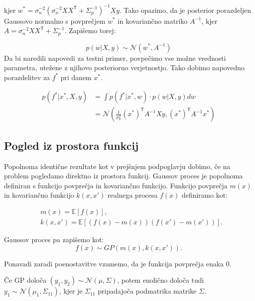 \documentclass[12pt,a4paper]{amsart}
\theoremstyle{definition} %
\theoremstyle{plain} %
\begin{document}
kjer $w^* =  \sigma_{n}^{-2} (  \sigma_{n}^{-2} X X^\mathsf{T} + \Sigma_{p}^{-1})^{-1}Xy$. Tako opazimo, da je posterior porazdeljen Gaussovo normalno s povprečjem
$w^*$ in kovariančno matriko $A^{-1}$, kjer $ A =  \sigma_{n}^{-2} X X^\mathsf{T} + \Sigma_{p}^{-1} $. Zapišemo torej:


\begin{equation}
 p(w |X,y) \sim \mathcal{N}(w^*, A^{-1}) 
\end{equation}
Da bi naredili napovedi za testni primer, povpečimo vse možne vrednosti parametra, utežene z njihovo posteriorno verjetnostjo.
Tako dobimo napovedno porazdelitev za $ f^{*}$ pri danem $x^{*}$.

\begin{equation}
\begin{split}
 p( f^* | x^*, X,y) &= \int p(f^* | x^*, w) \cdot p(w| X, y) dw  \\
 &= \mathcal{N}(\frac{1}{ \sigma_{n}^2} (x^*)^\mathsf{T} A^{-1} X y, (x^*)^\mathsf{T} A^{-1} x^*) 
 \end{split}
\end{equation}

\subsection{Pogled iz prostora funkcij}

Popolnoma identične rezultate kot v prejšnjem podpoglavju dobimo, če na problem pogledamo direktno iz prostora funkcij. 
Gaussov proces je popolnoma definiran s funkcijo povprečja in kovariančno funkcijo. Funkcijo povprečja $m(x)$ in kovariančno funkcijo $k(x,x')$  realnega procesa $f(x)$ definiramo kot: 

\begin{equation}
\begin{split}
&m(x) = \mathbb{E}[f(x)], \\
&k(x,x') =\mathbb{E}[ (f(x) - m(x)) (f(x')-m(x'))].
\end{split}
\end{equation}

Gaussov proces pa zapišemo kot: 
\begin{equation}
f(x) \sim GP (m(x), k(x,x')).
\end{equation}

\opomba Ponavadi zaradi poenostavitve vzamemo, da je funkcija povprečja enaka 0. 

\label{izrek} { Če GP določa $ (y_{1}, y_{2})  \sim  \mathcal{N}(\mu, \Sigma) $, 
potem enolično določa tudi $y_{1} \sim  \mathcal{N}(\mu_{1}, \Sigma_{11})$, kjer je
$\Sigma_{11}$ pripadajoča podmatrika matrike $\Sigma$. }
\end{document}
